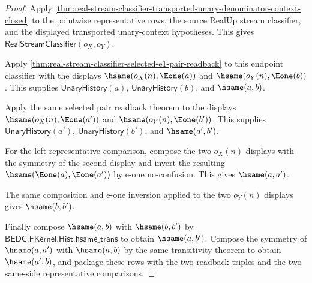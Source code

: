 \begin{proof}
Apply
\autoref{thm:real-stream-classifier-transported-unary-denominator-context-closed}
to the pointwise representative rows, the source RealUp stream classifier, and
the displayed transported unary-context hypotheses. This gives
$\mathsf{RealStreamClassifier}(o_X,o_Y)$.

Apply \autoref{thm:real-stream-classifier-selected-e1-pair-readback} to this
endpoint classifier with the displays $\hsame(o_X(n),\Eone(a))$ and
$\hsame(o_Y(n),\Eone(b))$. This supplies $\mathsf{UnaryHistory}(a)$,
$\mathsf{UnaryHistory}(b)$, and $\hsame(a,b)$.

Apply the same selected pair readback theorem to the displays
$\hsame(o_X(n),\Eone(a'))$ and $\hsame(o_Y(n),\Eone(b'))$. This supplies
$\mathsf{UnaryHistory}(a')$, $\mathsf{UnaryHistory}(b')$, and
$\hsame(a',b')$.

For the left representative comparison, compose the two $o_X(n)$ displays with
the symmetry of the second display and invert the resulting
$\hsame(\Eone(a),\Eone(a'))$ by e-one no-confusion. This gives
$\hsame(a,a')$.

The same composition and e-one inversion applied to the two $o_Y(n)$ displays
gives $\hsame(b,b')$.

Finally compose $\hsame(a,b)$ with $\hsame(b,b')$ by
$\mathsf{BEDC.FKernel.Hist.hsame\_trans}$ to obtain $\hsame(a,b')$. Compose
the symmetry of $\hsame(a,a')$ with $\hsame(a,b)$ by the same transitivity
theorem to obtain $\hsame(a',b)$, and package these rows with the two readback
triples and the two same-side representative comparisons.
\end{proof}
